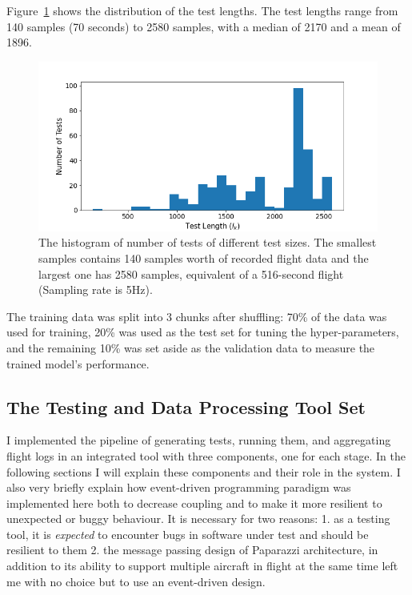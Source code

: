 Figure~\ref{fig:paparazzi_test_length} shows the distribution of the test lengths. The test lengths range from 140 samples (70 seconds) to 2580 samples, with a median of 2170 and a mean of 1896.
\begin{figure}
    \centering
    \includegraphics[width=\columnwidth]{6_files/test_lengths.png}
    \caption{The histogram of number of tests of different test sizes. The smallest samples contains 140 samples worth of recorded flight data and the largest one has 2580 samples, equivalent of a 516-second flight (Sampling rate is 5Hz). }
    \label{fig:paparazzi_test_length}
\end{figure}

The training data was split into 3 chunks after shuffling: 70\% of the data was used for training, 20\% was used as the test set for tuning the hyper-parameters, and the remaining 10\% was set aside as the validation data to measure the trained model's performance. 







\subsection{The Testing and Data Processing Tool Set}\label{section:fuzzing_tool}
I implemented the pipeline of generating tests, running them, and aggregating flight logs in an integrated tool with three components, one for each stage. In the following sections I will explain these components and their role in the system. I also very briefly explain how event-driven programming paradigm was implemented here both to decrease coupling and to make it more resilient to unexpected or buggy behaviour. It is necessary for two reasons: 1. as a testing tool, it is \textit{expected} to encounter bugs in software under test and should be resilient to them 2. the message passing design of Paparazzi architecture, in addition to its ability to support multiple aircraft in flight at the same time left me with no choice but to use an event-driven design.


